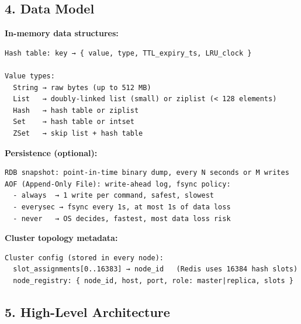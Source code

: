 \documentclass[11pt]{article}
\begin{document}
\subsection{4. Data Model}\label{4-data-model-2}

\textbf{In-memory data structures:}

\setcodelang{}

\begin{verbatim}
Hash table: key → { value, type, TTL_expiry_ts, LRU_clock }

Value types:
  String → raw bytes (up to 512 MB)
  List   → doubly-linked list (small) or ziplist (< 128 elements)
  Hash   → hash table or ziplist
  Set    → hash table or intset
  ZSet   → skip list + hash table
\end{verbatim}

\textbf{Persistence (optional):}

\setcodelang{}

\begin{verbatim}
RDB snapshot: point-in-time binary dump, every N seconds or M writes
AOF (Append-Only File): write-ahead log, fsync policy:
  - always  → 1 write per command, safest, slowest
  - everysec → fsync every 1s, at most 1s of data loss
  - never   → OS decides, fastest, most data loss risk
\end{verbatim}

\textbf{Cluster topology metadata:}

\setcodelang{}

\begin{verbatim}
Cluster config (stored in every node):
  slot_assignments[0..16383] → node_id   (Redis uses 16384 hash slots)
  node_registry: { node_id, host, port, role: master|replica, slots }
\end{verbatim}

\subsection{5. High-Level Architecture}\label{5-high-level-architecture-2}

\setcodelang{}
\end{document}

